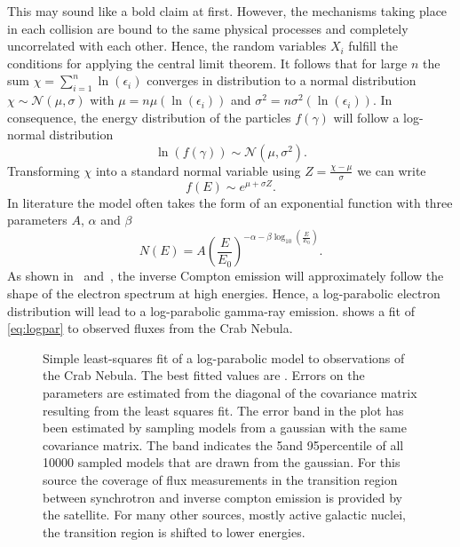 This may sound like a bold claim at first. However, the mechanisms taking place in each collision are 
bound to the same physical processes and completely uncorrelated with each other.
Hence, the random variables $X_i$ fulfill the conditions for applying the central limit theorem. It follows that for large $n$ the sum  
$\chi = \sum_{i=1}^n \ln(\epsilon_{i})$ converges in distribution to a normal distribution $\chi \sim \mathcal{N}(\mu, \sigma)$ 
with $\mu = n \mu(\ln(\epsilon_i))$ and $\sigma^2 = n \sigma^2(\ln(\epsilon_i))$.
In consequence, the energy distribution of the particles $f(\gamma)$ will follow a log-normal distribution~\cite[312]{stats_degroot}
\begin{equation*}
  \ln\left(f(\gamma)\right) \sim \mathcal{N}(\mu, \sigma^2).
\end{equation*}
Transforming $\chi$ into a standard normal variable using $Z = \frac{\chi - \mu}{\sigma}$ we can write 
\begin{equation*}
  f(E) \sim e^{\mu + \sigma Z}.
\end{equation*}
 In literature the model often takes the form of an exponential function with three parameters $A$, $\alpha$ and $\beta$
\begin{equation}
  \label{eq:logpar}
  N(E) = A \left( \frac{E}{E_0} \right)^{-\alpha -\beta \log_{10}\left(\frac{E}{E_0}\right)}.
\end{equation}
As shown in~\cite[\S5]{massaro_logpar_mrk} and~\cite{lefa_kelner_shape}, the  inverse Compton emission will 
approximately follow the shape of the electron spectrum at high energies. 
Hence, a log-parabolic electron distribution will lead to a log-parabolic gamma-ray emission. 
 shows a fit of \cref{eq:logpar} to observed fluxes from the Crab Nebula. 


\begin{figure}[]
  \centering
  
  \caption[Fit to the high-energy Crab emission]{Simple least-squares fit of a log-parabolic model to observations of the Crab Nebula.
  The best fitted values are \protect{}. 
  Errors on the parameters are estimated from the diagonal of the covariance matrix resulting from the least squares fit. 
  The error band in the plot has been estimated by sampling models from a gaussian with the same covariance matrix.
  The band indicates the 5\th and 95\th percentile of all \num{10000} sampled models that are drawn from the gaussian.
  For this source the coverage of flux measurements in the transition region between synchrotron and inverse compton emission 
  is provided by the \fermi satellite. For many other sources, mostly active galactic nuclei, the transition region is shifted to lower energies.
  }
  \label{fig:sed_fit_he}
\end{figure}


